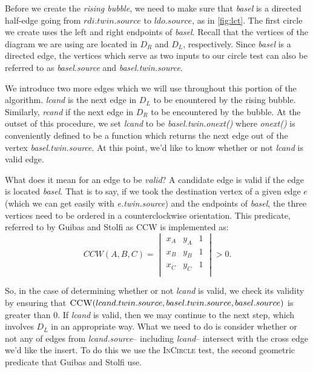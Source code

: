 \documentclass[12pt,twoside]{reedthesis}
\begin{document}
  Before we create the \emph{rising bubble}, we need to make sure that \emph{basel} is a directed half-edge going from $rdi.twin.source$ to $ldo.source$, as in \cref{fig:lct}. The first circle we create uses the left and right endpoints of \emph{basel}. Recall that the vertices of the diagram we are using are located in $D_{R}$ and $D_{L}$, respectively. Since \emph{basel} is a directed edge, the vertices which serve as two inputs to our circle test can also be referred to as \emph{basel.source} and \emph{basel.twin.source}.\par

  We introduce two more edges which we will use throughout this portion of the algorithm. \emph{lcand} is the next edge in $D_{L}$ to be enountered by the rising bubble. Similarly, \emph{rcand} if the next edge in $D_{R}$ to be encountered by the bubble. At the outset of this procedure, we set \emph{lcand} to be \emph{basel.twin.onext()} where \emph{onext()} is conveniently defined to be a function which returns the next edge out of the vertex \emph{basel.twin.source}. At this point, we'd like to know whether or not \emph{lcand} is valid edge. \par 

  What does it mean for an edge to be \emph{valid}? A candidate edge is valid if the edge is located  \emph{basel}. That is to say, if we took the destination vertex of a given edge $e$ (which we can get easily with \emph{e.twin.source}) and the endpoints of \emph{basel}, the three vertices need to be ordered in a counterclockwise orientation. This predicate, referred to by Guibas and Stolfi as \textsc{CCW} is implemented as:
  $$
  CCW(A,B,C) =
  \begin{vmatrix}
  x_{A} & y_{A} & 1 \\
  x_{B} & y_{B} & 1 \\
  x_{C} & y_{C} & 1 \\  
  \end{vmatrix} > 0.
  $$  

  So, in the case of determining whether or not \emph{lcand} is valid, we check its validity by ensuring that $\textsc{CCW}(lcand.twin.source, basel.twin.source, basel.source)$ is greater than 0. If \emph{lcand} is valid, then we may continue to the next step, which involves  $D_{L}$ in an appropriate way. What we need to do is consider whether or not any of edges from \emph{lcand.source}-- including \emph{lcand}-- intersect with the cross edge we'd like the insert. To do this we use the \textsc{InCircle} test, the second geometric predicate that Guibas and Stolfi use. 
\end{document}

